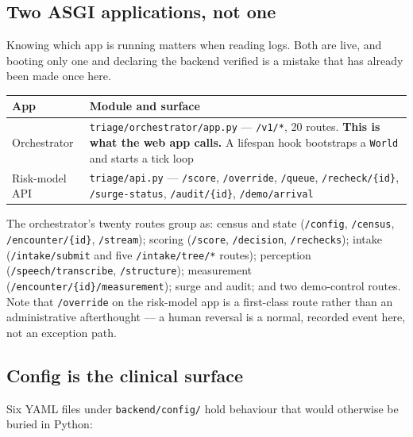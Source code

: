 \documentclass[10pt,a4paper,twocolumn]{article}
\newcommand{\pth}[1]{\textcolor{SecPurple}{\texttt{#1}}}
\newcommand{\cm}[1]{\texttt{#1}}
\begin{document}
\subsection{Two ASGI applications, not one}
Knowing which app is running matters when reading logs. Both are live, and booting only one and
declaring the backend verified is a mistake that has already been made once here.

\begin{center}\footnotesize\sffamily
\begin{tabular}{@{}p{1.9cm}p{5.9cm}@{}}
\toprule
\rowcolor{AccPurple!10}
\textbf{App} & \textbf{Module and surface}\\
\midrule
Orchestrator & \cm{triage/orchestrator/app.py} --- \cm{/v1/*}, 20 routes. \textbf{This is what the web app calls.} A lifespan hook bootstraps a \cm{World} and starts a tick loop\\
\addlinespace[2pt]
Risk-model API & \cm{triage/api.py} --- \cm{/score}, \cm{/override}, \cm{/queue}, \cm{/recheck/\{id\}}, \cm{/surge-status}, \cm{/audit/\{id\}}, \cm{/demo/arrival}\\
\bottomrule
\end{tabular}
\end{center}

\vspace{3pt}
\noindent The orchestrator's twenty routes group as: census and state (\cm{/config},
\cm{/census}, \cm{/encounter/\{id\}}, \cm{/stream}); scoring (\cm{/score}, \cm{/decision},
\cm{/rechecks}); intake (\cm{/intake/submit} and five \cm{/intake/tree/*} routes); perception
(\cm{/speech/transcribe}, \cm{/structure}); measurement
(\cm{/encounter/\{id\}/measurement}); surge and audit; and two demo-control routes. Note that
\cm{/override} on the risk-model app is a first-class route rather than an administrative
afterthought --- a human reversal is a normal, recorded event here, not an exception path.

\subsection{Config is the clinical surface}
Six YAML files under \pth{backend/config/} hold behaviour that would otherwise be buried in Python:
\end{document}
